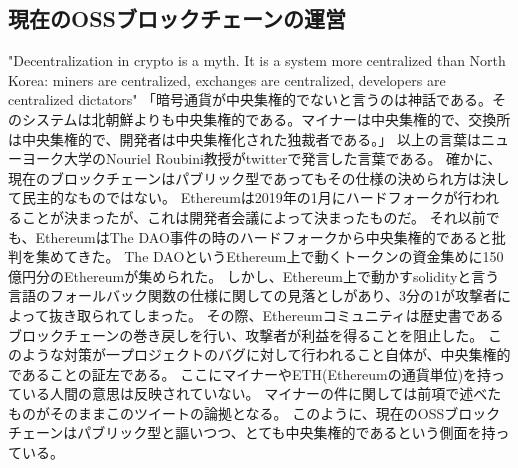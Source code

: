 \subsection{現在のOSSブロックチェーンの運営}
"Decentralization in crypto is a myth. It is a system more centralized than North Korea: miners are centralized, exchanges are centralized, developers are centralized dictators"
「暗号通貨が中央集権的でないと言うのは神話である。そのシステムは北朝鮮よりも中央集権的である。マイナーは中央集権的で、交換所は中央集権的で、開発者は中央集権化された独裁者である。」
以上の言葉はニューヨーク大学のNouriel Roubini教授がtwitterで発言した言葉である。
確かに、現在のブロックチェーンはパブリック型であってもその仕様の決められ方は決して民主的なものではない。
Ethereumは2019年の1月にハードフォークが行われることが決まったが、これは開発者会議によって決まったものだ。
それ以前でも、EthereumはThe DAO事件の時のハードフォークから中央集権的であると批判を集めてきた。
The DAOというEthereum上で動くトークンの資金集めに150億円分のEthereumが集められた。
しかし、Ethereum上で動かすsolidityと言う言語のフォールバック関数の仕様に関しての見落としがあり、3分の1が攻撃者によって抜き取られてしまった。
その際、Ethereumコミュニティは歴史書であるブロックチェーンの巻き戻しを行い、攻撃者が利益を得ることを阻止した。
このような対策が一プロジェクトのバグに対して行われること自体が、中央集権的であることの証左である。
ここにマイナーやETH(Ethereumの通貨単位)を持っている人間の意思は反映されていない。
マイナーの件に関しては前項で述べたものがそのままこのツイートの論拠となる。
このように、現在のOSSブロックチェーンはパブリック型と謳いつつ、とても中央集権的であるという側面を持っている。